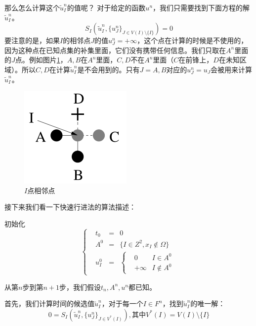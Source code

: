 那么怎么计算这个$\widetilde{u}^n_I$的值呢？
对于给定的函数$u^n$，我们只需要找到下面方程的解$\widetilde{u}^n_I$。
\begin{equation}
    \label{solve_un}
    S_I(\widetilde{u}^n_I, \{u^n_J\}_{J \in V(I) \setminus \{I\}}) = 0
\end{equation}
要注意的是，如果$I$的相邻点$J$的值$u^n_J = +\infty$，这个点在计算的时候是不使用的，因为这种点在已知点集的补集里面，它们没有携带任何信息。我们只取在$A^n$里面的$J$点。例如图片\ref{closer_points}，$A, B$在$A^n$里面，$C, D$不在$A^n$里面（$C$在前锋上，$D$在未知区域）。所以$C, D$在计算$\widetilde{u}^n_I$是不会用到的。只有$J = A, B$对应的$u^n_J = u_J$会被用来计算$\widetilde{u}^n_I$。
\begin{figure}[h!]
    \centering
    \includegraphics[width=150bp]{figure/closer_points.png}
    \caption{$I$点相邻点}
    \label{closer_points}
\end{figure}

接下来我们看一下快速行进法的算法描述：

初始化
\begin{equation*}
    \label{fmm_init}
    \left\{
    \begin{aligned}
    & t_0 & = & 0 \\
    & A^0 & = & \{I \in Z^2, x_I \notin \Omega\} \\
    & u^0_I & = & \left\{
        \begin{aligned}
        & 0 & I \in A^0 \\
        & +\infty & I \notin A^0
        \end{aligned}
        \right.
    \end{aligned}
    \right.
\end{equation*}

从第$n$步到第$n+1$步，我们假设$t_n, A^n, u^n$都已知。

首先，我们计算时间的候选值$\widetilde{u}^n_I$，对于每一个$I \in F^n$，找到$\widetilde{u}^n_I$的唯一解：
\begin{equation*}
    \label{uI_unique}
    0 = S_I(\widetilde{u}^n_I, \{u^n_J\}_{J \in V^*(I)}), \mbox{其中} V^*(I) = V(I) \setminus \{I\}
\end{equation*}

